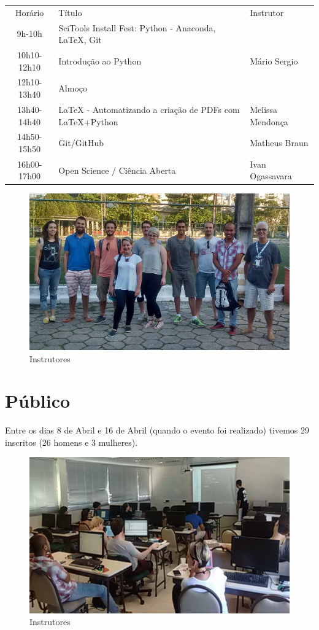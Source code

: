 \documentclass[12pt]{article}
\begin{document}
\begin{tabular}{cll}
  Horário & Título & Instrutor \\
  9h-10h & SciTools Install Fest: Python - Anaconda, LaTeX, Git & \\
  10h10-12h10 & Introdução ao Python & Mário Sergio \\
  12h10-13h40 & Almoço \\
  13h40-14h40 & LaTeX - Automatizando a criação de PDFs com LaTeX+Python & Melissa Mendonça \\
  14h50-15h50 & Git/GitHub & Matheus Braun \\
  16h00-17h00 & Open Science / Ciência Aberta & Ivan Ogassavara \\
\end{tabular}


\begin{figure}[!htb]
\includegraphics[width=\textwidth]{../../media/photos/pre4-cut}
\caption{Instrutores}
\end{figure}

\newpage

\section*{Público}

Entre os dias 8 de Abril e 16 de Abril (quando o evento foi realizado)
tivemos 29 inscritos (26 homens e 3 mulheres).

\begin{figure}[!htb]
\includegraphics[width=\textwidth]{../../media/photos/pre0-cut}
\caption{Instrutores}
\end{figure}
\end{document}
